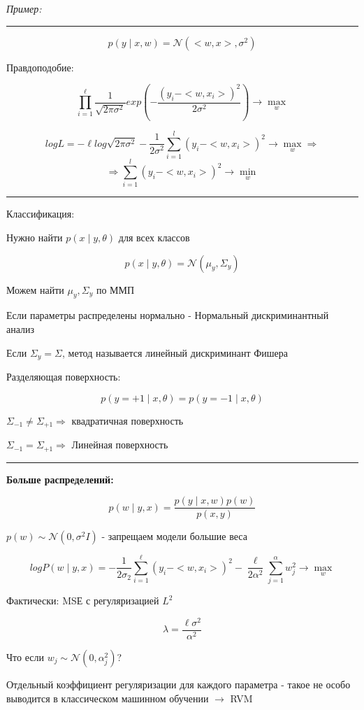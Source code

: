 \documentclass[a4paper, 12pt]{article}
\begin{document}
\textit{Пример:}

\rule{\linewidth}{0.5pt}
\[p(y \mid x, w) = \mathcal{N}(<w, x>, \sigma^{2})\]

Правдоподобие:

\[\prod_{i = 1}^{\ell}\frac{1}{\sqrt{2 \pi \sigma^{2}}}
exp(-\frac{(y_i - <w, x_i>)^{2}}{2\sigma^{2}}) 
\rightarrow \max_{w}\]

\[logL = -\ell log\sqrt{2 \pi \sigma^{2}} - 
\frac{1}{2 \sigma^{2}}\sum_{i = 1}^{l}(y_i - <w, x_i>)^2
\rightarrow \max_{w} \Rightarrow\]
\[\Rightarrow \sum_{i = 1}^{l}(y_i - <w, x_i>)^2 
\rightarrow \min_{w}\]
\rule{\linewidth}{0.5pt}
\newline

Классификация:

Нужно найти $p(x \mid y, \theta)$ для всех классов

\[p(x \mid y, \theta) = \mathcal{N}(\mu_{y}, \Sigma_{y})\]

Можем найти $\mu_y, \Sigma_y$ по ММП

Если параметры распределены нормально - 
Нормальный дискриминантный анализ

Если $\Sigma_y = \Sigma$, метод называется
линейный дискриминант Фишера

Разделяющая поверхность:

\[p(y = +1 \mid x, \theta) = p(y = -1 \mid x, \theta)\]

$\Sigma_{-1} \neq \Sigma_{+1} \Rightarrow$ квадратичная поверхность

$\Sigma_{-1} = \Sigma_{+1} \Rightarrow$ Линейная поверхность

\rule{\linewidth}{0.5pt}

\textbf{Больше распределений:}

\[p(w \mid y, x) = \frac{p(y \mid x, w)p(w)}{p(x, y)}\]

$p(w) \sim \mathcal{N}(0, \sigma^{2}I)$ - запрещаем модели большие веса

\[logP(w \mid y, x) = 
-\frac{1}{2\sigma_{2}}\sum_{i = 1}^{\ell}(y_i - <w, x_i>)^2 -
\frac{\ell}{2\alpha^{2}}\sum_{j = 1}^{\alpha}w_{j}^{2} 
\rightarrow \max_{w}\]

Фактически: MSЕ с регуляризацией $L^2$

\[\lambda = \frac{\ell \sigma^{2}}{\alpha^{2}}\]

Что если $w_j \sim \mathcal{N}(0, \alpha_j^2)$?

Отдельный коэффициент регуляризации для каждого
параметра - такое не особо выводится в классическом 
машинном обучении $\rightarrow$ RVM
\end{document}
